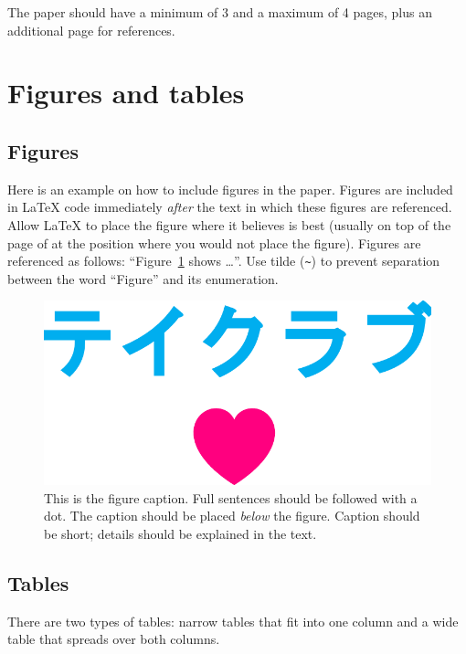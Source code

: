 \documentclass[10pt, a4paper]{article}
\begin{document}
The paper should have a minimum of 3 and a maximum of 4 pages, plus an additional page for references.

\section{Figures and tables}

\subsection{Figures}

Here is an example on how to include figures in the paper. Figures are included in \LaTeX{} code immediately \textit{after} the text in which these figures are referenced. Allow \LaTeX{} to place the figure where it believes is best (usually on top of the page of at the position where you would not place the figure). Figures are referenced as follows: ``Figure~\ref{fig:figure1} shows \dots''. Use tilde (\verb.~.) to prevent separation between the word ``Figure'' and its enumeration. 

\begin{figure}
\begin{center}
\includegraphics[width=\columnwidth]{drawing.pdf}
\caption{This is the figure caption. Full sentences should be followed with a dot. The caption should be placed \textit{below} the figure. Caption should be short; details should be explained in the text.}
\label{fig:figure1}
\end{center}
\end{figure}

\subsection{Tables}

There are two types of tables: narrow tables that fit into one column and a wide table that spreads over both columns.
\end{document}
